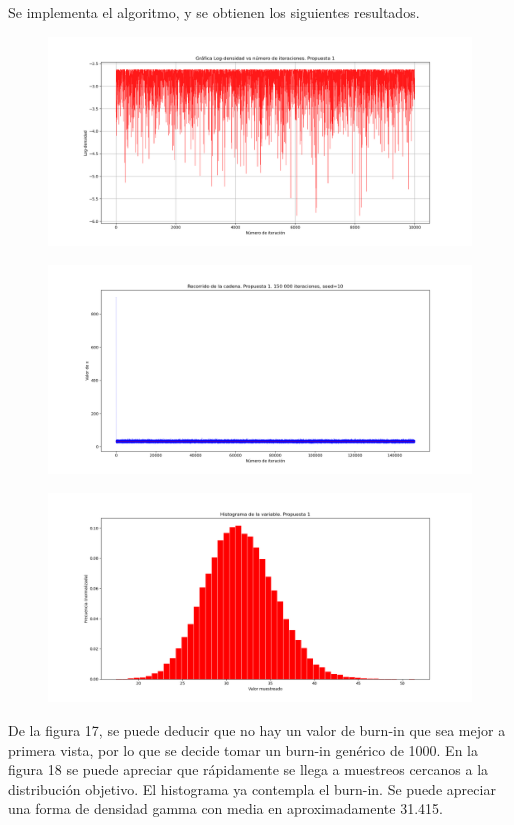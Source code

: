 \documentclass[letterpaper]{article}
\newcommand{\1}{\mathds{1}}
\theoremstyle{definition}
\theoremstyle{definition}
\theoremstyle{definition}
\theoremstyle{definition}
\theoremstyle{definition}
\begin{document}
    Se implementa el algoritmo, y se obtienen los siguientes resultados.
    \begin{figure}[h!]
        \centering
        \includegraphics[width=\linewidth]{17.png}
        \caption{}
    \end{figure} 
    \begin{figure}[h!]
        \centering
        \includegraphics[width=\linewidth]{18.png}
        \caption{}
    \end{figure} 
    \begin{figure}[h!]
        \centering
        \includegraphics[width=\linewidth]{19.png}
        \caption{}
    \end{figure} 
    De la figura 17, se puede deducir que no hay un valor de burn-in que sea mejor a primera vista, por lo que 
    se decide tomar un burn-in genérico de 1000. En la figura 18 se puede apreciar que rápidamente se llega a muestreos cercanos 
    a la distribución objetivo. El histograma ya contempla el burn-in. Se puede apreciar una forma de densidad gamma con media en aproximadamente 31.415.\\
\end{document}
